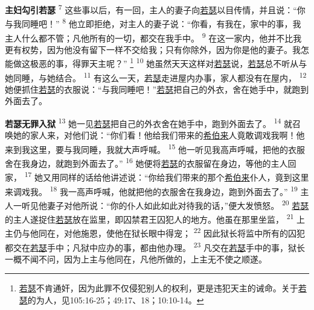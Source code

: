 \textbf{主妇勾引若瑟 }
\textsuperscript{7}
这些事以后，有一回，主人的妻子向\uline{若瑟}以目传情，并且说：“你与我同睡吧！”
\textsuperscript{8}
他立即拒绝，对主人的妻子说：“你看，有我在，家中的事，我主人什么都不管；凡他所有的一切，都交在我手中。
\textsuperscript{9}
在这一家内，他并不比我更有权势，因为他没有留下一样不交给我；只有你除外，因为你是他的妻子。我怎能做这极恶的事，得罪天主呢？”
\footnote{\uline{若瑟}不肯通奸，因为此罪不仅侵犯别人的权利，更是违犯天主的诫命。关于\uline{若瑟}的为人，见105:16-25；49:17、18；10:10-14。}
\textsuperscript{10}
她虽然天天这样对\uline{若瑟}说，\uline{若瑟}总不听从与她同睡，与她结合。
\textsuperscript{11}
有这么一天，\uline{若瑟}走进屋内办事，家人都没有在屋内，
\textsuperscript{12}
她便抓住\uline{若瑟}的衣服说：“与我同睡吧！”\uline{若瑟}把自己的外衣，舍在她手中，就跑到外面去了。

\textbf{若瑟无罪入狱 }
\textsuperscript{13}
她一见\uline{若瑟}把自己的外衣舍在她手中，跑到外面去了。
\textsuperscript{14}
就召唤她的家人来，对他们说：“你们看！他给我们带来的\uline{希伯来}人竟敢调戏我啊！他来到我这里，要与我同睡，我就大声呼喊。
\textsuperscript{15}
他一听见我高声呼喊，把他的衣服舍在我身边，就跑到外面去了。”
\textsuperscript{16}
她便将\uline{若瑟}的衣服留在身边，等他的主人回家，
\textsuperscript{17}
她又用同样的话给他讲述说：“你给我们带来的那个\uline{希伯来}仆人，竟到这里来调戏我。
\textsuperscript{18}
我一高声呼喊，他就把他的衣服舍在我身边，跑到外面去了。”
\textsuperscript{19}
主人一听见他妻子对他所说：“你的仆人如此如此对待我的话，”便大发愤怒。
\textsuperscript{20}
\uline{若瑟}的主人遂捉住\uline{若瑟}放在监里，即囚禁君王囚犯人的地方。他虽在那里坐监，
\textsuperscript{21}
上主仍与他同在，对他施恩，使他在狱长眼中得宠；
\textsuperscript{22}
因此狱长将监中所有的囚犯都交在\uline{若瑟}手中；凡狱中应办的事，都由他办理。
\textsuperscript{23}
凡交在\uline{若瑟}手中的事，狱长一概不闻不问，因为上主与他同在，凡他所做的，上主无不使之顺遂。

